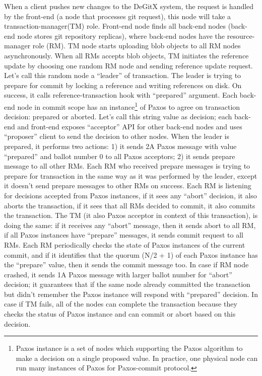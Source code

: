 \documentclass[sigplan, screen, nonacm, 11pt]{acmart}
\begin{document}
When a client pushes new changes to the DeGitX system,
the request is handled by the front-end (a node that processes git request),
this node will take a transaction-manager(TM) role.
Front-end node finds all back-end nodes (back-end node stores git repository replicas),
where back-end nodes have the resource-manager role (RM).
TM node starts uploading blob objects to all RM nodes asynchronously.
When all RMs accepts blob objects,
TM initiates the reference update by choosing one random RM node and sending reference update request.
Let's call this random node a ``leader'' of transaction.
The leader is trying to prepare for commit by locking a reference and writing references on disk.
On success, it calls reference-transaction hook with ``prepared'' argument.
Each back-end node in commit scope has an instance\footnote{Paxos instance is a set of nodes
which supporting the Paxos algorithm to make a decision on a single proposed value.
In practice, one physical node can run many instances of Paxos for Paxos-commit protocol.}
of Paxos to agree on transaction decision: prepared or aborted.
Let's call this string value as decision;
each back-end and front-end exposes ``acceptor'' API for other back-end nodes and uses ``proposer'' client
to send the decision to other nodes.
When the leader is prepared, it performs two actions:
1) it sends 2A Paxos message with value ``prepared'' and ballot number 0 to all Paxos acceptors;
2) it sends prepare message to all other RMs.
Each RM who received prepare messages is trying to prepare for transaction in the same way as it was performed by the leader,
except it doesn't send prepare messages to other RMs on success.
Each RM is listening for decisions accepted from Paxos instances, if it sees any ``abort'' decision,
it also aborts the transaction, if it sees that all RMs decided to commit, it also commits the transaction.
The TM (it also Paxos acceptor in context of this transaction), is doing the same:
if it receives any ``abort'' message, then it sends abort to all RM, if all Paxos instances have ``prepare'' messages,
it sends commit request to all RMs.
Each RM periodically checks the state of Paxos instances of the current commit, and if it identifies
that the quorum (N/2 + 1) of each Paxos instance has the ``prepare'' value, then it sends the commit message too.
In case if RM node crashed, it sends 1A Paxos message with larger ballot number for ``abort'' decision;
it guarantees that if the same node already committed the transaction
but didn't remember the Paxos instance will respond with ``prepared'' decision.
In case if TM fails, all of the nodes can complete the transaction because they checks the status
of Paxos instance and can commit or abort based on this decision.
\end{document}
